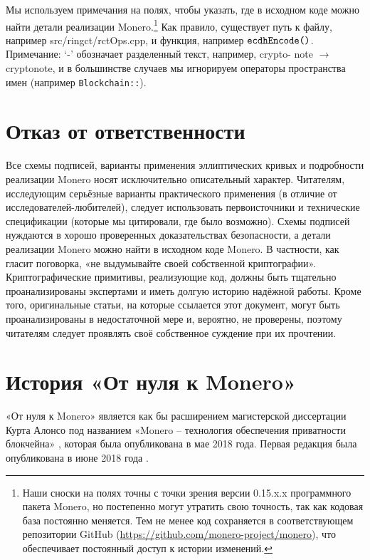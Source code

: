 Мы используем примечания на полях, чтобы указать, где в исходном коде можно найти детали реализации Monero.\footnote{Наши сноски на полях точны с точки зрения версии 0.15.x.x программного пакета Monero, но постепенно могут утратить свою точность, так как кодовая база постоянно меняется. Тем не менее код сохраняется в соответствующем репозитории GitHub (\url{https://github.com/monero-project/monero}), что обеспечивает постоянный доступ к истории изменений.} Как правило, существует путь к файлу, например src/ringct/rctOps.cpp, и функция, например \(\textrm{{\tt ecdhEncode()}}\). Примечание: `-' обозначает разделенный текст, например, crypto- note $\rightarrow$ cryptonote, и в большинстве случаев мы игнорируем операторы пространства имен (например {\tt Blockchain::}).



\section{Отказ от ответственности}

Все схемы подписей, варианты применения эллиптических кривых и подробности реализации Monero носят исключительно описательный характер. Читателям, исследующим серьёзные варианты практического применения (в отличие от исследователей-любителей), следует ис\-пользовать первоисточники и технические спецификации (которые мы цитировали, где было возможно). Схемы подписей нуждаются в хорошо проверенных доказательствах безопасности, а детали реализации Monero можно найти в исходном коде Monero. В частности, как гласит поговорка, «не выдумывайте своей собственной криптографии». Криптографические прими\-тивы, реализующие код, должны быть тщательно проанализированы экспертами и иметь долгую историю надёжной работы. Кроме того, оригинальные статьи, на которые ссылается этот документ, могут быть проанализированы в недостаточной мере и, вероятно, не проверены, поэтому читателям следует проявлять своё собственное суждение при их прочтении.



\section{История «От нуля к Monero»}

«От нуля к Monero» является как бы расширением магистерской диссертации Курта Алонсо под названием «Monero – технология обеспечения приватности блокчейна» \cite{kurt-original}, которая была опубликована в мае 2018 года. Первая редакция была опубликована в июне 2018 года \cite{ztm-1}.


